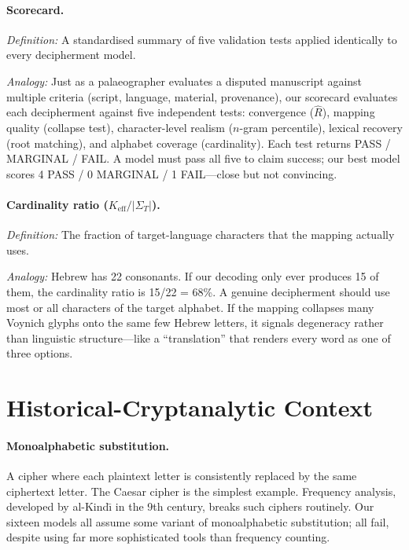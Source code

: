 \documentclass[11pt,a4paper]{article}
\begin{document}
\paragraph{Scorecard.}
\textit{Definition:} A standardised summary of five validation tests applied identically to every decipherment model.

\textit{Analogy:} Just as a palaeographer evaluates a disputed manuscript against multiple criteria (script, language, material, provenance), our scorecard evaluates each decipherment against five independent tests: convergence ($\hat{R}$), mapping quality (collapse test), character-level realism ($n$-gram percentile), lexical recovery (root matching), and alphabet coverage (cardinality).  Each test returns PASS / MARGINAL / FAIL.  A model must pass all five to claim success; our best model scores 4 PASS / 0 MARGINAL / 1 FAIL---close but not convincing.

\paragraph{Cardinality ratio ($K_{\mathrm{eff}} / |\Sigma_T|$).}
\textit{Definition:} The fraction of target-language characters that the mapping actually uses.

\textit{Analogy:} Hebrew has 22 consonants.  If our decoding only ever produces 15 of them, the cardinality ratio is 15/22 = 68\%.  A genuine decipherment should use most or all characters of the target alphabet.  If the mapping collapses many Voynich glyphs onto the same few Hebrew letters, it signals degeneracy rather than linguistic structure---like a ``translation'' that renders every word as one of three options.


\section{Historical-Cryptanalytic Context}

\paragraph{Monoalphabetic substitution.}
A cipher where each plaintext letter is consistently replaced by the same ciphertext letter.  The Caesar cipher is the simplest example.  Frequency analysis, developed by al-Kind\=\i{} in the 9th century, breaks such ciphers routinely.  Our sixteen models all assume some variant of monoalphabetic substitution; all fail, despite using far more sophisticated tools than frequency counting.
\end{document}
